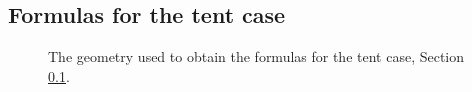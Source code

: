 \documentclass[reqno]{amsart}
\theoremstyle{definition} \newtheorem{definition}{Definition}[section]
\theoremstyle{definition} \newtheorem{remark}[definition]{Remark}
\theoremstyle{plain} \newtheorem{lemma}[definition]{Lemma}
\theoremstyle{plain} \newtheorem{proposition}[definition]{Proposition}
\theoremstyle{plain} \newtheorem{theorem}[definition]{Theorem}
\theoremstyle{plain} \newtheorem{corollary}[definition]{Corollary}
\theoremstyle{definition} \newtheorem{example}[definition]{Example}
\theoremstyle{plain} \newtheorem{claim}[clai]{Claim}
\theoremstyle{definition} \newtheorem{assumption}[definition]{Assumption}
\theoremstyle{definition} \newtheorem{observation}[definition]{Observation}
\newcommand{\1}{\mathbbm 1}
\numberwithin{equation}{section} %
\theoremstyle{plain} \newtheorem*{theorem*}{Theorem}
\theoremstyle{plain} \newtheorem{mthm}[maintheorem]{Main Theorem}
\theoremstyle{plain} \newtheorem*{mthm*}{Main Theorem}
\theoremstyle{plain} \newtheorem*{conjecture*}{Conjecture}
\theoremstyle{plain} \newtheorem{conjecture}[definition]{Conjecture}
\theoremstyle{plain} \newtheorem*{problem*}{Problem}
\begin{document}
%  
%


\subsection{Formulas for the tent case}
\label{Ss:comput_tent_new}


\begin{figure}
\resizebox{.5\textwidth}{!}{}
\caption{The geometry used to obtain the formulas for the tent case, Section \ref{Ss:comput_tent_new}.}
\label{Fig:tent_comput_geo}
\end{figure}
\end{document}
